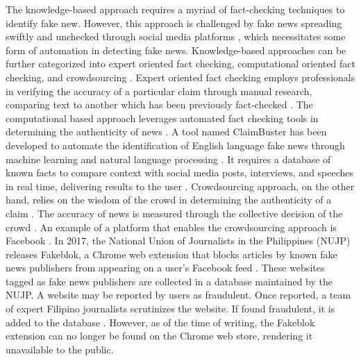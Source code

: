 The knowledge-based approach requires a myriad of fact-checking techniques to identify fake new. However, this approach is challenged by fake news spreading swiftly and unchecked through social media platforms \cite{qazvinian2011rumor}, which necessitates some form of automation in detecting fake news. Knowledge-based approaches can be further categorized into expert oriented fact checking, computational oriented fact checking, and crowdsourcing \cite{debeer2020approaches}. Expert oriented fact checking employs professionals in verifying the accuracy of a particular claim through manual research, comparing text to another which has been previously fact-checked \cite{vlachos2014factchecking}. The computational based approach leverages automated fact checking tools in determining the authenticity of news \cite{ahmed2019combining}. A tool named ClaimBuster \cite{claimbuster, hassan2017proposal} has been developed to automate the identification of English language fake news through machine learning and natural language processing \cite{hassan2017toward}. It requires a database of known facts to compare context with social media posts, interviews, and speeches in real time, delivering results to the user \cite{hassan2017toward}. Crowdsourcing approach, on the other hand, relies on the wisdom of the crowd in determining the authenticity of a claim \cite{ahmed2019combining}. The accuracy of news is measured through the collective decision of the crowd \cite{pennycook2019fighting}. An example of a platform that enables the crowdsourcing approach is Facebook \cite{tschiatschek2017detecting}. In 2017, the National Union of Journalists in the Philippines (NUJP) releases Fakeblok, a Chrome web extension that blocks articles by known fake news publishers from appearing on a user's Facebook feed \cite{inquirer-fakeblok, rappler-fakeblok}. These websites tagged as fake news publishers are collected in a database maintained by the NUJP. A website may be reported by users as fraudulent. Once reported, a team of expert Filipino journalists scrutinizes the website. If found fraudulent, it is added to the database \cite{cdi-fakeblok}. However, as of the time of writing, the Fakeblok extension can no longer be found on the Chrome web store, rendering it unavailable to the public.

